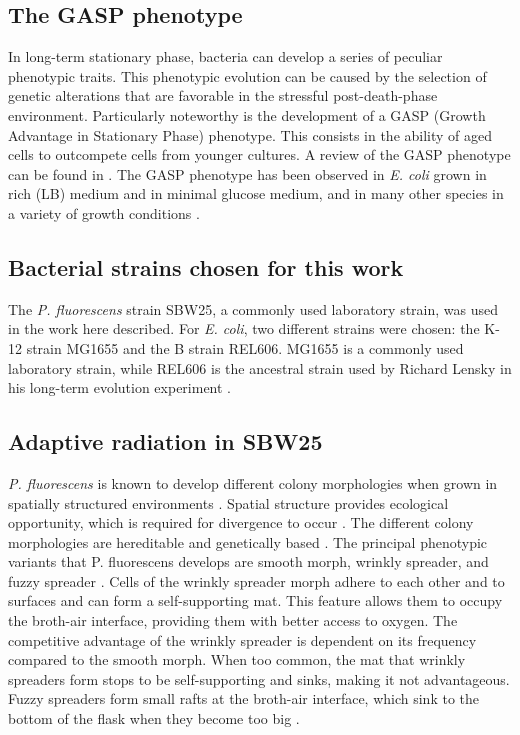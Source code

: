 \documentclass[
    11pt,
    a4paper,
    twoside
]{article} %
\begin{document}
\begin{multicols}{2}
\subsection*{The GASP phenotype}
In long-term stationary phase, bacteria can develop a series of peculiar phenotypic traits.
This phenotypic evolution can be caused by the selection of genetic alterations that are favorable in the stressful post-death-phase environment.
Particularly noteworthy is the development of a GASP (Growth Advantage in Stationary Phase) phenotype.
This consists in the ability of aged cells to outcompete cells from younger cultures.
A review of the GASP phenotype can be found in \citet{Zambrano1996}.
The GASP phenotype has been observed in \textit{E. coli} grown in rich (LB) medium and in minimal glucose medium, and in many other species in a variety of growth conditions \citep{Zinser2004}.

\subsection*{Bacterial strains chosen for this work}
The \textit{P. fluorescens} strain SBW25, a commonly used laboratory strain, was used in the work here described.
For \textit{E. coli}, two different strains were chosen: the K-12 strain MG1655 and the B strain REL606.
MG1655 is a commonly used laboratory strain, while REL606 is the ancestral strain used by Richard Lensky in his long-term evolution experiment \citep{Good2017}.

\subsection*{Adaptive radiation in SBW25}
\textit{P. fluorescens} is known to develop different colony morphologies when grown in spatially structured environments \citep{Ferguson2013}.
Spatial structure provides ecological opportunity, which is required for divergence to occur \citep{Rainey1998}.
The different colony morphologies are hereditable and genetically based \citep{Rainey1998}.
The principal phenotypic variants that {P. fluorescens} develops are smooth morph, wrinkly spreader, and fuzzy spreader \citep{Rainey1998}.
Cells of the wrinkly spreader morph adhere to each other and to surfaces and can form a self-supporting mat.
This feature allows them to occupy the broth-air interface, providing them with better access to oxygen.
The competitive advantage of the wrinkly spreader is dependent on its frequency compared to the smooth morph.
When too common, the mat that wrinkly spreaders form stops to be self-supporting and sinks, making it not advantageous.
Fuzzy spreaders form small rafts at the broth-air interface, which sink to the bottom of the flask when they become too big \citep{Ferguson2013}.


\end{multicols}
\end{document}
